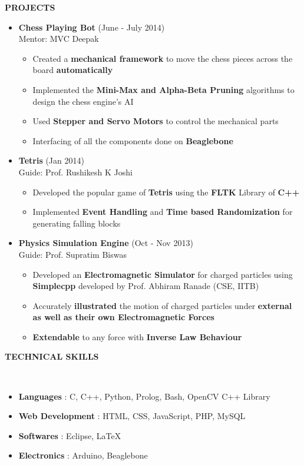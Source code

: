 \documentclass[a4paper,10pt]{article}
\newcommand{\lsep}{-0.5cm}
\newcommand{\resheading}[1]{{\small \colorbox{mygrey}{\begin{minipage}{0.975\textwidth}{\textbf{#1 \vphantom{p\^{E}}}}\end{minipage}}}}
\begin{document}
\resheading{\textbf{PROJECTS}}
\begin{itemize}
 \itemsep 0em
 \item {\bf Chess Playing Bot} \hfill {(June - July 2014)} \\
 \hspace*{5mm}   Mentor: MVC Deepak
 \begin{itemize}
  \itemsep 0em
  \item Created a {\bf mechanical framework} to move the chess pieces across the board {\bf automatically}
  \item Implemented the {\bf Mini-Max and Alpha-Beta Pruning} algorithms to design the chess engine's AI
  \item Used {\bf Stepper and Servo Motors} to control the mechanical parts
  \item Interfacing of all the components done on {\bf Beaglebone }
 \end{itemize}
 
 \item {\bf Tetris} \hfill {(Jan 2014)} \\
 \hspace*{5mm}   Guide: Prof. Rushikesh K Joshi
 \begin{itemize}
  \itemsep 0em
  \item Developed the popular game of {\bf Tetris} using the {\bf FLTK} Library of {\bf C++}
  \item Implemented {\bf Event Handling} and {\bf Time based Randomization} for generating falling blocks 
 \end{itemize}
 
 \item {\bf Physics Simulation Engine} \hfill {(Oct - Nov 2013)} \\
 \hspace*{5mm}   Guide: Prof. Supratim Biswas
 \begin{itemize}
  \itemsep 0em
  \item Developed an {\bf Electromagnetic Simulator} for charged particles using {\bf Simplecpp} developed by Prof. Abhiram Ranade (CSE, IITB)
  \item Accurately {\bf illustrated} the motion of charged particles under {\bf external as well as their own Electromagnetic Forces}
  \item {\bf Extendable} to any force with {\bf Inverse Law Behaviour}
 \end{itemize}
\end{itemize}

\resheading{\textbf{TECHNICAL SKILLS} }\\[\lsep]
\begin{itemize}
  \itemsep 0em
  \item \textbf{Languages} : C, C++, Python, Prolog, Bash, OpenCV C++ Library 
  \item \textbf{Web Development} : HTML, CSS, JavaScript, PHP, MySQL
  \item \textbf{Softwares} : Eclipse, \LaTeX
  \item \textbf{Electronics} : Arduino, Beaglebone
\end{itemize} 
\end{document}
